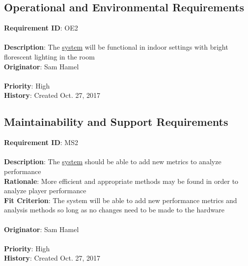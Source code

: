 \documentclass[11pt]{article}
\begin{document}
\subsection{Operational and Environmental Requirements}

\begin{framed}
	\noindent\textbf{Requirement ID}: OE2 \\\\
	\noindent\textbf{Description}: The \hyperref[sec:definitions]{system} will be functional in indoor settings with bright florescent lighting in the room \\
	\textbf{Originator}: Sam Hamel \\\\
	\textbf{Priority}: High \hfill \\
	\noindent\textbf{History}: Created Oct. 27, 2017
\end{framed}

\subsection{Maintainability and Support Requirements}

\begin{framed}
	\noindent\textbf{Requirement ID}: MS2 \\\\
	\noindent\textbf{Description}: The \hyperref[sec:definitions]{system} should be able to add new metrics to analyze performance\\
	\textbf{Rationale}: More efficient and appropriate methods may be found in order to analyze player performance\\
	\textbf{Fit Criterion}: The system will be able to add new performance metrics and analysis methods so long as no changes need to be made to the hardware\\\\
	\textbf{Originator}: Sam Hamel \\\\
	\textbf{Priority}: High \hfill \\
	\noindent\textbf{History}: Created Oct. 27, 2017
\end{framed}
\end{document}
